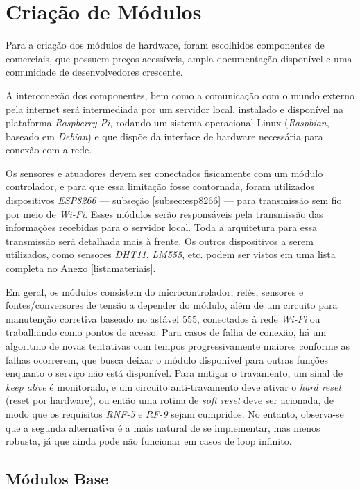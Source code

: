 \section{Criação de Módulos}
Para a criação dos módulos de hardware, foram escolhidos componentes de \wiot{} comerciais, que possuem preços acessíveis, ampla documentação disponível e uma comunidade de desenvolvedores crescente.

A interconexão dos componentes, bem como a comunicação com o mundo externo pela internet será intermediada por um servidor local, instalado e disponível na plataforma \emph{Raspberry Pi}, rodando um sistema operacional Linux (\emph{Raspbian}, baseado em \emph{Debian}) e que dispõe da interface de hardware necessária para conexão com a rede.

Os sensores e atuadores devem ser conectados fisicamente com um módulo controlador, e para que essa limitação fosse contornada, foram utilizados dispositivos \emph{ESP8266} --- subseção \ref{subsec:esp8266} --- para transmissão sem fio por meio de \emph{Wi-Fi}. Esses módulos serão responsáveis pela transmissão das informações recebidas para o servidor local. Toda a arquitetura para essa transmissão será detalhada mais à frente. Os outros dispositivos a serem utilizados, como sensores \emph{DHT11}, \emph{LM555}, etc. podem ser vistos em uma lista completa no Anexo \ref{listamateriais}.

Em geral, os módulos consistem do microcontrolador, relés, sensores e fontes\slash{}conversores de tensão a depender do módulo, além de um circuito para manutenção corretiva baseado no astável 555, conectados à rede \emph{Wi-Fi} ou trabalhando como pontos de acesso. Para casos de falha de conexão, há um algoritmo de novas tentativas com tempos progressivamente maiores conforme as falhas ocorrerem, que busca deixar o módulo disponível para outras funções enquanto o serviço não está disponível. Para mitigar o travamento, um sinal de \textit{keep alive} é monitorado, e um circuito anti-travamento deve ativar o \textit{hard reset} (reset por hardware), ou então uma rotina de \textit{soft reset} deve ser acionada, de modo que os requisitos \emph{RNF-5} e \emph{RF-9} sejam cumpridos. No entanto, observa-se que a segunda alternativa é a mais natural de se implementar, mas menos robusta, já que ainda pode não funcionar em casos de loop infinito.

\subsection{Módulos Base}
